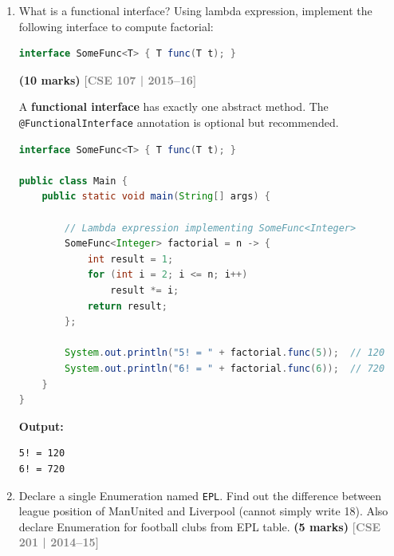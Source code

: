 \documentclass[12pt,a3paper]{article}
\newcommand{\yr}[1]{\hfill\textcolor{gray}{\small\textbf{[#1]}}}
\newcommand{\mk}[1]{\textcolor{orange!70!black}{\small\textbf{(#1 marks)}}}
\begin{document}
\begin{enumerate}
\begin{tcolorbox}
\end{tcolorbox}

\item What is a functional interface? Using lambda expression, implement the following interface to compute factorial:
\begin{lstlisting}[language=Java]
interface SomeFunc<T> { T func(T t); }
\end{lstlisting}
\mk{10}
\yr{CSE 107 | 2015--16}

\begin{tcolorbox}[enhanced,breakable,ansbox,
  colback=cH!4,colframe=cH,boxrule=0.8pt,arc=5pt,
  title={\textbf{Answer --- Functional Interface \& Lambda: Factorial}},
  fonttitle=\bfseries\color{white},colbacktitle=cH]

A \textbf{functional interface} has exactly one abstract method.
The \texttt{@FunctionalInterface} annotation is optional but recommended.

\begin{lstlisting}[language=Java]
interface SomeFunc<T> { T func(T t); }

public class Main {
    public static void main(String[] args) {

        // Lambda expression implementing SomeFunc<Integer>
        SomeFunc<Integer> factorial = n -> {
            int result = 1;
            for (int i = 2; i <= n; i++)
                result *= i;
            return result;
        };

        System.out.println("5! = " + factorial.func(5));  // 120
        System.out.println("6! = " + factorial.func(6));  // 720
    }
}
\end{lstlisting}

\textbf{Output:}
\begin{lstlisting}
5! = 120
6! = 720
\end{lstlisting}

\end{tcolorbox}


\item Declare a single Enumeration named \texttt{EPL}. Find out the difference between league position of ManUnited and Liverpool (cannot simply write 18). Also declare Enumeration for football clubs from EPL table. \mk{5}
\yr{CSE 201 | 2014--15}

\begin{tcolorbox}[enhanced,breakable,ansbox,
  colback=cH!4,colframe=cH,boxrule=0.8pt,arc=5pt,
  title={\textbf{Answer --- \texttt{EPL} Enum: Position Difference}},
  fonttitle=\bfseries\color{white},colbacktitle=cH]


\end{tcolorbox}
\end{enumerate}
\end{document}
